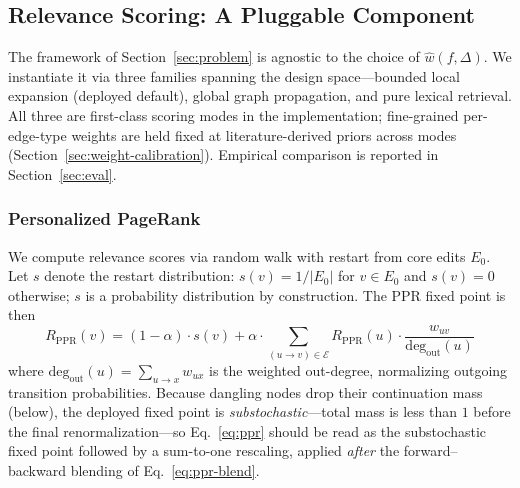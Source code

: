 \documentclass[11pt, a4paper]{article}
\begin{document}
\subsection{Relevance Scoring: A Pluggable Component}
\label{sec:scoring}

The framework of Section~\ref{sec:problem} is agnostic to the choice of $\hat{w}(f, \Delta)$. We instantiate it via three families spanning the design space---bounded local expansion (deployed default), global graph propagation, and pure lexical retrieval. All three are first-class scoring modes in the implementation; fine-grained per-edge-type weights are held fixed at literature-derived priors across modes (Section~\ref{sec:weight-calibration}). Empirical comparison is reported in Section~\ref{sec:eval}.

\subsubsection{Personalized PageRank}
\label{sec:ppr}

We compute relevance scores via random walk with restart from core edits $E_0$. Let $s$ denote the restart distribution: $s(v) = 1/|E_0|$ for $v \in E_0$ and $s(v) = 0$ otherwise; $s$ is a probability distribution by construction. The PPR fixed point is then
\begin{equation}
    R_{\mathrm{PPR}}(v) = (1-\alpha) \cdot s(v) + \alpha \cdot \sum_{(u \to v) \in \mathcal{E}} R_{\mathrm{PPR}}(u) \cdot \frac{w_{uv}}{\text{deg}_{\text{out}}(u)}
\label{eq:ppr}
\end{equation}
where $\text{deg}_{\text{out}}(u) = \sum_{u \to x} w_{ux}$ is the weighted out-degree, normalizing outgoing transition probabilities. Because dangling nodes drop their continuation mass (below), the deployed fixed point is \emph{substochastic}---total mass is less than $1$ before the final renormalization---so Eq.~\eqref{eq:ppr} should be read as the substochastic fixed point followed by a sum-to-one rescaling, applied \emph{after} the forward--backward blending of Eq.~\eqref{eq:ppr-blend}.
\end{document}
